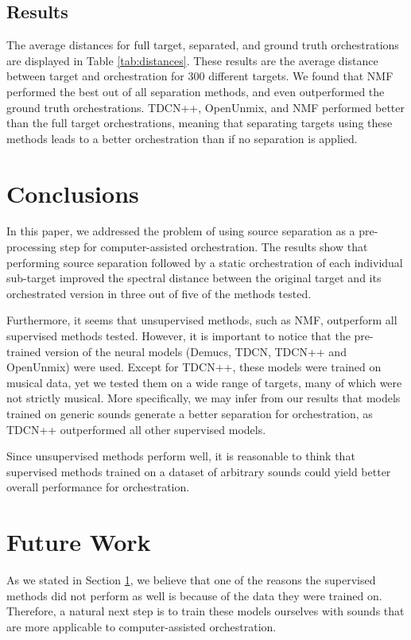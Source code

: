 \documentclass{article}
\begin{document}
		\subsection{Results}
		The average distances for full target, separated, and ground truth orchestrations are displayed in Table \ref{tab:distances}. These results are the average distance between target and orchestration for 300 different targets. We found that NMF performed the best out of all separation methods, and even outperformed the ground truth orchestrations. TDCN++, OpenUnmix, and NMF performed better than the full target orchestrations, meaning that separating targets using these methods leads to a better orchestration than if no separation is applied.
	
	\section{Conclusions}\label{sec:conclusions}
	In this paper, we addressed the problem of using source separation as a pre-processing step for computer-assisted orchestration. The results show that performing source separation followed by a static orchestration of each individual sub-target improved the spectral distance between the original target and its orchestrated version in three out of five of the methods tested.
	
	Furthermore, it seems that unsupervised methods, such as NMF, outperform all supervised methods tested. However, it is important to notice that the pre-trained version of the neural models (Demucs, TDCN, TDCN++ and OpenUnmix) were used. Except for TDCN++, these models were trained on musical data, yet we tested them on a wide range of targets, many of which were not strictly musical. More specifically, we may infer from our results that models trained on generic sounds generate a better separation for orchestration, as TDCN++ outperformed all other supervised models.
	
	Since unsupervised methods perform well, it is reasonable to think that supervised methods trained on a dataset of arbitrary sounds could yield better overall performance for orchestration.
	
	\section{Future Work}\label{sec:futurework}

	As we stated in Section \ref{sec:conclusions}, we believe that one of the reasons the supervised methods did not perform as well is because of the data they were trained on. Therefore, a natural next step is to train these models ourselves with sounds that are more applicable to computer-assisted orchestration.
	
\end{document}
